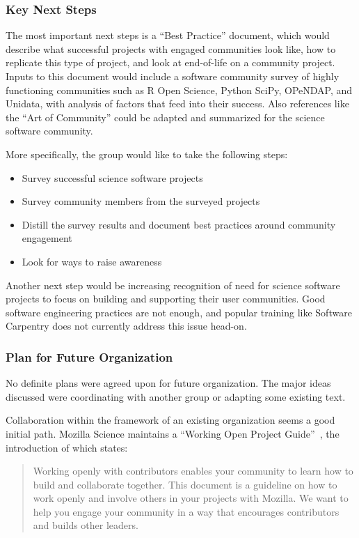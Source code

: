 \subsubsection{Key Next Steps}

The most important next steps is a ``Best Practice'' document, which would
describe what successful projects with engaged communities look like, how to
replicate this type of project, and look at end-of-life on a community project.
Inputs to this document would include a software community survey of highly
functioning communities such as R Open Science, Python SciPy, OPeNDAP, and
Unidata, with analysis of factors that feed into their success. Also references
like the ``Art of Community'' could be adapted and summarized for the science
software community.

More specifically, the group would like to take the following steps:

\begin{itemize}
\item Survey successful science software projects
\item Survey community members from the surveyed projects
\item Distill the survey results and document best practices around community engagement
\item Look for ways to raise awareness
\end{itemize}

Another next step would be increasing recognition of need for science software
projects to focus on building and supporting their user communities. Good software
engineering practices are not enough, and popular training like Software
Carpentry does not currently address this issue head-on.

\subsubsection{Plan for Future Organization}

No definite plans were agreed upon for future organization. The major ideas discussed
were coordinating with another group or adapting some existing text.

Collaboration within the framework of an existing organization seems a good initial
path. Mozilla Science maintains a ``Working Open Project
Guide''~\cite{working-open-wssspe3}, the introduction of which states:
\begin{quote}
Working openly with contributors enables your community to learn how to build
and collaborate together. This document is a guideline on how to work openly and
involve others in your projects with Mozilla. We want to help you engage your
community in a way that encourages contributors and builds other leaders.
 \end{quote}

